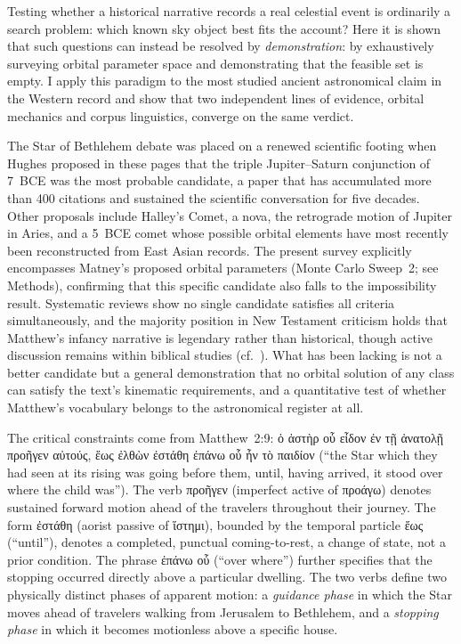 \documentclass[sn-nature]{sn-jnl}
\newcommand{\grk}[1]{{\fontencoding{LGR}\selectfont #1}}
\newcommand{\grk}[1]{{\greekfont #1}}
\begin{document}
Testing whether a historical narrative records a real celestial event is
ordinarily a search problem: which known sky object best fits the account?
Here it is shown that such questions can instead be resolved by \emph{demonstration}:
by exhaustively surveying orbital parameter space and demonstrating that the
feasible set is empty.
I apply this paradigm to the most studied ancient astronomical claim
in the Western record and show that two independent lines of evidence, orbital
mechanics and corpus linguistics, converge on the same verdict.

The Star of Bethlehem debate was placed on a renewed scientific footing when Hughes
proposed in these pages that the triple Jupiter--Saturn conjunction of 7~BCE
was the most probable candidate\cite{hughes1976,hughes1979}, a paper that has
accumulated more than 400 citations and sustained the scientific conversation
for five decades. Other proposals include Halley's Comet\cite{kokkinos1989},
a nova\cite{kidger1999,clark1977}, the retrograde motion of Jupiter in
Aries\cite{molnar1999}, and a 5~BCE comet whose possible orbital elements have most
recently been reconstructed from East Asian records\cite{humphreys1992star,matney2025jbaa}.
The present survey explicitly encompasses Matney's proposed orbital parameters
(Monte Carlo Sweep~2; see Methods), confirming that this specific candidate
also falls to the impossibility result.
Systematic reviews show no single candidate satisfies all criteria
simultaneously\cite{adair2013star,schaefer2015}, and the majority position in New Testament
criticism holds that Matthew's infancy narrative is legendary rather than
historical\cite{brown1993,sugihyono2025,merz2015}, though active discussion remains within biblical studies (cf.\ \cite{barthel2015,schaefer2015molnar,freitag1979}).
What has been lacking is not a better candidate but a general demonstration that no orbital solution 
of any class can satisfy the text's kinematic requirements, and a quantitative test of whether 
Matthew's vocabulary belongs to the astronomical register at all.

The critical constraints come from Matthew~2:9:
\grk{ὁ ἀστὴρ οὗ εἶδον ἐν τῇ ἀνατολῇ προῆγεν αὐτούς, ἕως ἐλθὼν
ἐστάθη ἐπάνω οὗ ἦν τὸ παιδίον}
(``the Star which they had seen at its rising was going before them, until,
having arrived, it stood over where the child was'').
The verb \grk{προῆγεν} (imperfect active of \grk{προάγω}) denotes sustained
forward motion ahead of the travelers throughout their journey.
The form \grk{ἐστάθη} (aorist passive of \grk{ἵστημι}), bounded by the
temporal particle \grk{ἕως} (``until''), denotes a completed, punctual
coming-to-rest, a change of state, not a prior condition\cite{adair2013star}. 
The phrase \grk{ἐπάνω οὗ} (``over where'') further
specifies that the stopping occurred directly above a particular
dwelling\cite{adair2013star,heilen2015,bdag2000}.
The two verbs define two physically distinct phases of apparent motion:
a \emph{guidance phase} in which the Star moves ahead of travelers walking
from Jerusalem to Bethlehem, and a \emph{stopping phase} in which it becomes
motionless above a specific house.
\end{document}
